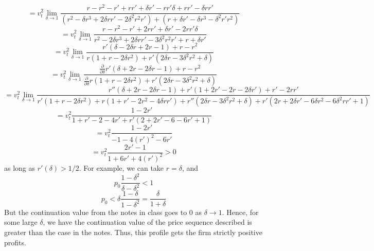 \documentclass[10pt,letter]{article}
\begin{document}
\[ = v_t^2 \lim_{\delta \to 1}   \frac{ r-r^2 -  r' + rr' + \delta r' - rr' \delta  + rr' - \delta r r' }{(r^2-\delta r^3+2\delta r r'-2 \delta^2 r^2 r') + (r + \delta r' - \delta r^3 - \delta^2 r' r^2 )} \]
\[ = v_t^2 \lim_{\delta \to 1}   \frac{ r-r^2 -  r' + 2 rr' + \delta r' - 2 rr' \delta }{ r^2-2 \delta r^3+2\delta r r'- 3 \delta^2 r^2 r' + r + \delta r'  } \]
\[ = v_t^2 \lim_{\delta \to 1}   \frac{r'(\delta - 2\delta r+ 2r -1) +  r-r^2   }{ r (1+ r-2 \delta r^2)+r'(2\delta r - 3 \delta^2 r^2 + \delta)   } \]
\[ = v_t^2 \lim_{\delta \to 1}   \frac{\frac{\partial}{\partial \delta} r'(\delta + 2 r - 2 \delta r- 1) + r-r^2  }{ \frac{\partial}{\partial \delta}r (1+ r-2 \delta r^2)+r'(2\delta r - 3 \delta^2 r^2 + \delta)   } \]
\[ = v_t^2 \lim_{\delta \to 1}   \frac{ r''(\delta + 2 r - 2 \delta r- 1)+r'(1 + 2 r' - 2 r - 2\delta r') + r' - 2rr' }{ r' (1+ r-2 \delta r^2) + r(1 + r' - 2r^2 - 4\delta rr')+r''(2\delta r - 3 \delta^2 r^2 + \delta) + r'(2r + 2\delta r' - 6 \delta r^2 - 6 \delta^2 r r' + 1)   } \]
\[ = v_t^2   \frac{ 1-2r' }{ 1 + r' - 2 - 4r' + r'(2 + 2 r' - 6 - 6 r' + 1)   } \]
\[ = v_t^2   \frac{ 1-2r' }{ -1  -4 (r')^2 - 6r'     } \]
\[ = v_t^2   \frac{ 2r' - 1 }{ 1  + 6r' + 4 (r')^2     }  > 0\]
as long as $r'(\delta) > 1/2$. For example, we can take $r = \delta$, and
\[ p_0\frac{1 - \delta^2 }{\delta - \delta^2} < 1 \]
\[ p_0 < \delta\frac{1 - \delta}{1 - \delta^2 } =  \frac{\delta}{1+\delta} \]
But the continuation value from the notes in class goes to $0$ as $\delta \to 1$. Hence, for some large $\delta$, we have the continuation value of the price sequence described is greater than the case in the notes. Thus, this profile gets the firm strictly positive profits.
\end{document}
